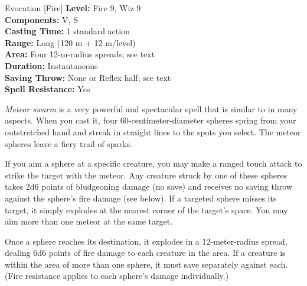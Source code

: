 {Evocation [Fire]}
{
	\textbf{Level:}
	Fire 9, Wiz 9\\
	\textbf{Components:}
	V, S\\
	\textbf{Casting Time:}
	1 standard action\\
	\textbf{Range:}
	Long (120 m + 12 m/level)\\
	\textbf{Area:}
	Four 12-m-radius spreads; see text\\
	\textbf{Duration:}
	Instantaneous\\
	\textbf{Saving Throw:}
	None or Reflex half; see text\\
	\textbf{Spell Resistance:}
	Yes\\
}
{
	\emph{Meteor swarm} is a very powerful and spectacular spell that is similar to  in many aspects. When you cast it, four 60-centimeter-diameter spheres spring from your outstretched hand and streak in straight lines to the spots you select. The meteor spheres leave a fiery trail of sparks.

	If you aim a sphere at a specific creature, you may make a ranged touch attack to strike the target with the meteor. Any creature struck by one of these spheres takes 2d6 points of bludgeoning damage (no save) and receives no saving throw against the sphere's fire damage (see below). If a targeted sphere misses its target, it simply explodes at the nearest corner of the target's space. You may aim more than one meteor at the same target.

	Once a sphere reaches its destination, it explodes in a 12-meter-radius spread, dealing 6d6 points of fire damage to each creature in the area. If a creature is within the area of more than one sphere, it must save separately against each. (Fire resistance applies to each sphere's damage individually.)

}
